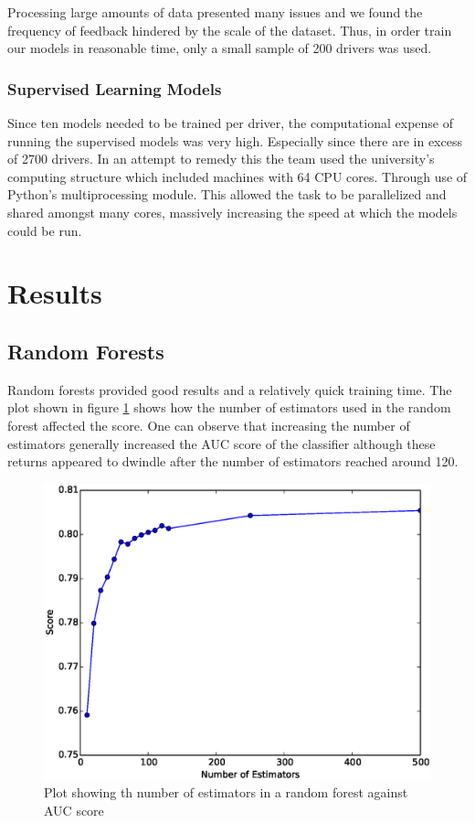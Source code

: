 \documentclass[a4paper, 11pt, twocolumn]{report}
\begin{document}
Processing large amounts of data presented many issues and we found the frequency of feedback hindered by the scale of the dataset.
Thus, in order train our models in reasonable time, only a small sample of 200 drivers was used.

\subsubsection{Supervised Learning Models}
Since ten models needed to be trained per driver, the computational expense of running the supervised models was very high. Especially since there are in excess of 2700 drivers. In an attempt to remedy this the team used the university's computing structure which included machines with 64 CPU cores. Through use of Python's multiprocessing module. This allowed the task to be parallelized and shared amongst many cores, massively increasing the speed at which the models could be run.



\section{Results}
\subsection{Random Forests}
Random forests provided good results and a relatively quick training time. 
The plot shown in figure \ref{fig:rfperf} shows how the number of estimators used in the random forest affected the score. 
One can observe that increasing the number of estimators generally increased the AUC score of the classifier although these returns appeared to dwindle after the number of estimators reached around 120.

\begin{figure}[h]
    \center
    \includegraphics[width=\linewidth]{img/rfperf}
    \caption{Plot showing th number of estimators in a random forest against AUC score}
    \label{fig:rfperf}
\end{figure}
\end{document}
